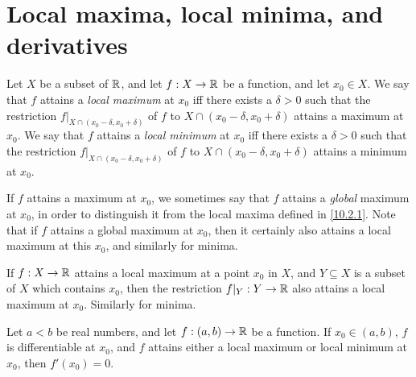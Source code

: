 \section{Local maxima, local minima, and derivatives}\label{sec:10.2}

\begin{defn}\label{10.2.1}
  Let \(X\) be a subset of \(\mathbb{R}\), and let \(f : X \to \mathbb{R}\) be a function, and let \(x_0 \in X\).
  We say that \(f\) attains a \emph{local maximum} at \(x_0\) iff there exists a \(\delta > 0\) such that the restriction \(f|_{X \cap (x_0 - \delta, x_0 + \delta)}\) of \(f\) to \(X \cap (x_0 - \delta, x_0 + \delta)\) attains a maximum at \(x_0\).
  We say that \(f\) attains a \emph{local minimum} at \(x_0\) iff there exists a \(\delta > 0\) such that the restriction \(f|_{X \cap (x_0 - \delta, x_0 + \delta)}\) of \(f\) to \(X \cap (x_0 - \delta, x_0 + \delta)\) attains a minimum at \(x_0\).
\end{defn}

\begin{rmk}\label{10.2.2}
  If \(f\) attains a maximum at \(x_0\), we sometimes say that \(f\) attains a \emph{global} maximum at \(x_0\), in order to distinguish it from the local maxima defined in \cref{10.2.1}.
  Note that if \(f\) attains a global maximum at \(x_0\), then it certainly also attains a local maximum at this \(x_0\), and similarly for minima.
\end{rmk}

\setcounter{thm}{4}
\begin{rmk}\label{10.2.5}
  If \(f : X \to \mathbb{R}\) attains a local maximum at a point \(x_0\) in \(X\), and \(Y \subseteq X\) is a subset of \(X\) which contains \(x_0\), then the restriction \(f|_Y : Y \to \mathbb{R}\) also attains a local maximum at \(x_0\).
  Similarly for minima.
\end{rmk}

\begin{prop}\label{10.2.6}
  Let \(a < b\) be real numbers, and let \(f : (a, b) \to \mathbb{R}\) be a function.
  If \(x_0 \in (a, b)\), \(f\) is differentiable at \(x_0\), and \(f\) attains either a local maximum or local minimum at \(x_0\), then \(f'(x_0) = 0\).
\end{prop}

